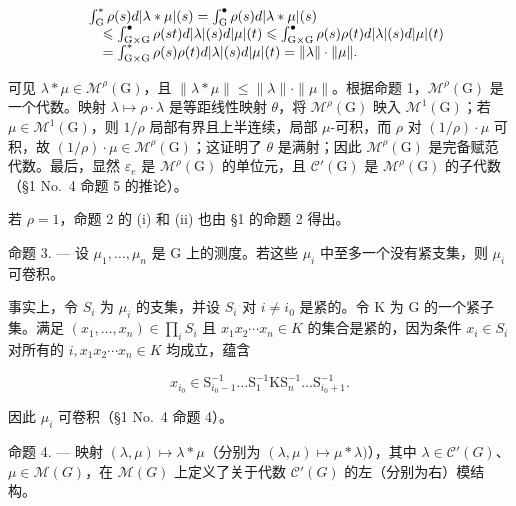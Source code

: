 \[
\begin{array}{r l} & {\int_ {\mathrm{G}} ^ {*} \rho (s) d | \lambda * \mu | (s) = \int_ {\mathrm{G}} ^ {\bullet} \rho (s) d | \lambda * \mu | (s)} \\ & {\quad \leqslant \int_ {\mathrm{G} \times \mathrm{G}} ^ {\bullet} \rho (s t) d | \lambda | (s) d | \mu | (t) \leqslant \int_ {\mathrm{G} \times \mathrm{G}} ^ {\bullet} \rho (s) \rho (t) d | \lambda | (s) d | \mu | (t)} \\ & {\quad = \int_ {\mathrm{G} \times \mathrm{G}} ^ {*} \rho (s) \rho (t) d | \lambda | (s) d | \mu | (t) = \| \lambda \| \cdot \| \mu \|.} \end{array}
\]

可见 \(\lambda * \mu \in \mathcal{M}^{\rho}(\mathrm{G})\)，且 \(\| \lambda * \mu \| \leqslant \| \lambda \| \cdot \| \mu \|\)。根据命题 1，\(\mathcal{M}^{\rho}(\mathrm{G})\) 是一个代数。映射 \(\lambda \mapsto \rho \cdot \lambda\) 是等距线性映射 \(\theta\)，将 \(\mathcal{M}^{\rho}(\mathrm{G})\) 映入 \(\mathcal{M}^{1}(\mathrm{G})\)；若 \(\mu \in \mathcal{M}^{1}(\mathrm{G})\)，则 \(1 / \rho\) 局部有界且上半连续，局部 \(\mu\)-可积，而 \(\rho\) 对 \((1 / \rho) \cdot \mu\) 可积，故 \((1 / \rho) \cdot \mu \in \mathcal{M}^{\rho}(\mathrm{G})\)；这证明了 \(\theta\) 是满射；因此 \(\mathcal{M}^{\rho}(\mathrm{G})\) 是完备赋范代数。最后，显然 \(\varepsilon_{e}\) 是 \(\mathcal{M}^{\rho}(\mathrm{G})\) 的单位元，且 \(\mathcal{C}'(\mathrm{G})\) 是 \(\mathcal{M}^{\rho}(\mathrm{G})\) 的子代数（§1 No.~4 命题 5 的推论）。

若 \(\rho = 1\)，命题 2 的 (i) 和 (ii) 也由 §1 的命题 2 得出。

命题 3. --- 设 \(\mu_1, \ldots, \mu_n\) 是 G 上的测度。若这些 \(\mu_i\) 中至多一个没有紧支集，则 \(\mu_i\) 可卷积。

事实上，令 \(S_{i}\) 为 \(\mu_{i}\) 的支集，并设 \(S_{i}\) 对 \(i \neq i_{0}\) 是紧的。令 K 为 G 的一个紧子集。满足 \((x_{1}, \ldots, x_{n}) \in \prod_{i} S_{i}\) 且 \(x_{1}x_{2} \cdots x_{n} \in K\) 的集合是紧的，因为条件 \(x_{i} \in S_{i}\) 对所有的 \(i, x_{1}x_{2} \cdots x_{n} \in K\) 均成立，蕴含

\[
x _ {i _ {0}} \in \mathrm{S} _ {i _ {0} - 1} ^ {- 1} \dots \mathrm{S} _ {1} ^ {- 1} \mathrm{KS} _ {n} ^ {- 1} \dots \mathrm{S} _ {i _ {0} + 1} ^ {- 1}.
\]

因此 \(\mu_{i}\) 可卷积（§1 No.~4 命题 4）。

命题 4. --- 映射 \((\lambda, \mu) \mapsto \lambda * \mu\)（分别为 \((\lambda, \mu) \mapsto \mu * \lambda)\)），其中 \(\lambda \in \mathcal{C}'(G)\)、\(\mu \in \mathcal{M}(G)\)，在 \(\mathcal{M}(G)\) 上定义了关于代数 \(\mathcal{C}'(G)\) 的左（分别为右）模结构。

